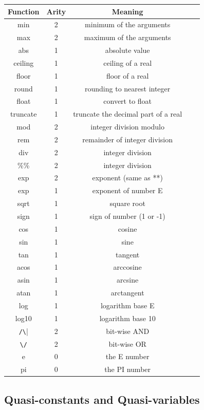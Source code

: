 \documentclass[11pt]{article}
\begin{document}
\begin{tabular}{|c|c|c|c|c|}
\hline
Function  & Arity & Meaning  \\ \hline
min & 2 & minimum of the arguments\\
max & 2 & maximum of the arguments\\
abs & 1 & absolute value \\
ceiling & 1 & ceiling of a real \\
floor & 1 & floor of a real \\
round & 1 & rounding to nearest integer \\
float & 1 & convert to float \\
truncate & 1 & truncate the decimal part of a real \\
mod & 2 & integer division modulo \\
rem & 2 & remainder of integer division\\
div & 2 & integer division\\
\%\% & 2 & integer division\\
exp & 2 & exponent (same as **)\\
exp & 1 & exponent of number E\\
sqrt & 1 & square root\\
sign & 1 & sign of number (1 or -1)\\
cos & 1 & cosine \\
sin & 1 & sine \\
tan & 1 & tangent \\
acos & 1 & arccosine\\ 
asin & 1 & arcsine\\ 
atan & 1 & arctangent\\ 
log & 1 & logarithm base E \\
log10 & 1 & logarithm base 10 \\
\verb|/\| & 2 & bit-wise AND \\
\verb|\/| & 2 & bit-wise OR \\
e & 0 & the E number\\
pi & 0 & the PI number\\
\hline
\end{tabular}

\subsection{Quasi-constants and Quasi-variables}\label{sec-quasi-constants}
\end{document}
